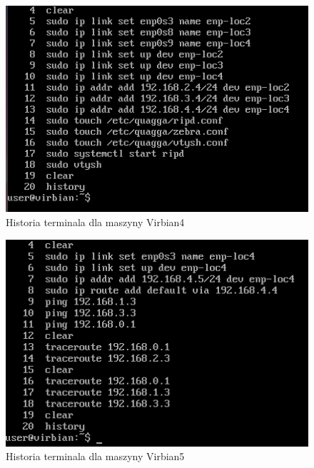 \documentclass[a4paper]{scrartcl}
\begin{document}
\begin{figure}
  \includegraphics[width=\linewidth]{hvib4.png}
  \caption{Historia terminala dla maszyny Virbian4}
\end{figure}
\begin{figure}
  \includegraphics[width=\linewidth]{hvib5.png}
  \caption{Historia terminala dla maszyny Virbian5}
\end{figure}
\end{document}

